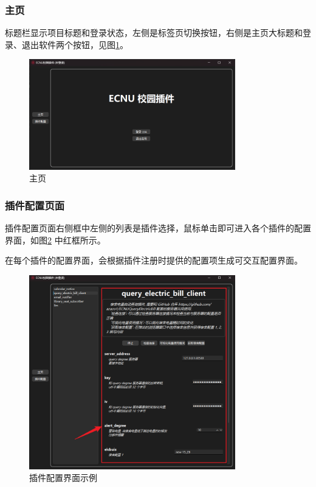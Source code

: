 \subsubsection{主页}

标题栏显示项目标题和登录状态，左侧是标签页切换按钮，右侧是主页大标题和登录、退出软件两个按钮，见图\ref{fig:home}。

\begin{figure}[H]
    \centering
    \includegraphics[width=0.8\textwidth]{img/home}
    \caption{主页}
    \label{fig:home}
\end{figure}

\subsubsection{插件配置页面}\label{subsubsec:gui-plugin-config}

插件配置页面右侧框中左侧的列表是插件选择，鼠标单击即可进入各个插件的配置界面，如图\ref{fig:plugin-config-gui} 中红框所示。

在每个插件的配置界面，会根据插件注册时提供的配置项生成可交互配置界面。

\begin{figure}[H]
    \centering
    \includegraphics[width=0.8\textwidth]{img/plugin_config_gui}
    \caption{插件配置界面示例}
    \label{fig:plugin-config-gui}
\end{figure}

